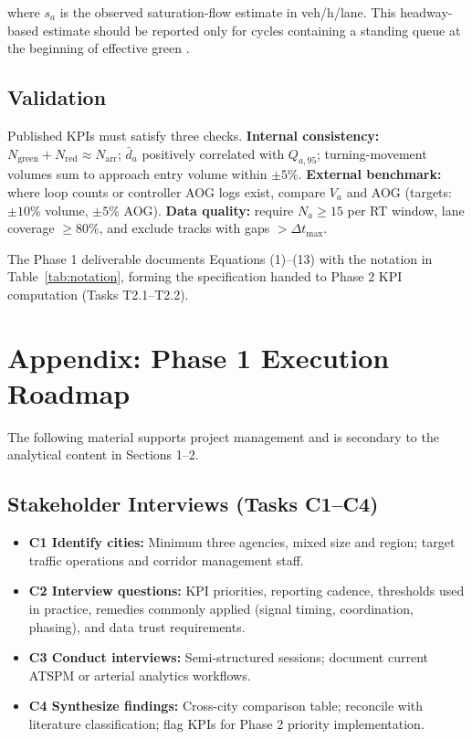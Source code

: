 \documentclass[11pt]{article}
\begin{document}
where $s_a$ is the observed saturation-flow estimate in veh/h/lane. This
headway-based estimate should be reported only for cycles containing a
standing queue at the beginning of effective green
\cite{nasem2022hcm,webster1958,akcelik1981signals}.

\subsection{Validation}

Published KPIs must satisfy three checks. \textbf{Internal consistency:} $N_{\mathrm{green}}+N_{\mathrm{red}}\approx N_{\mathrm{arr}}$; $\bar d_a$ positively correlated with $Q_{a,95}$; turning-movement volumes sum to approach entry volume within $\pm5\%$. \textbf{External benchmark:} where loop counts or controller AOG logs exist, compare $V_a$ and AOG (targets: $\pm10\%$ volume, $\pm5\%$ AOG). \textbf{Data quality:} require $N_a\geq15$ per RT window, lane coverage $\geq80\%$, and exclude tracks with gaps $>\Delta t_{\max}$.

The Phase 1 deliverable documents Equations (1)--(13) with the notation in Table~\ref{tab:notation}, forming the specification handed to Phase 2 KPI computation (Tasks T2.1--T2.2).



\appendix
\section*{Appendix: Phase 1 Execution Roadmap}

The following material supports project management and is secondary to the analytical content in Sections 1--2.

\subsection*{Stakeholder Interviews (Tasks C1--C4)}
\begin{itemize}
\item \textbf{C1 Identify cities:} Minimum three agencies, mixed size and region; target traffic operations and corridor management staff.
\item \textbf{C2 Interview questions:} KPI priorities, reporting cadence, thresholds used in practice, remedies commonly applied (signal timing, coordination, phasing), and data trust requirements.
\item \textbf{C3 Conduct interviews:} Semi-structured sessions; document current ATSPM or arterial analytics workflows.
\item \textbf{C4 Synthesize findings:} Cross-city comparison table; reconcile with literature classification; flag KPIs for Phase 2 priority implementation.
\end{itemize}
\end{document}
